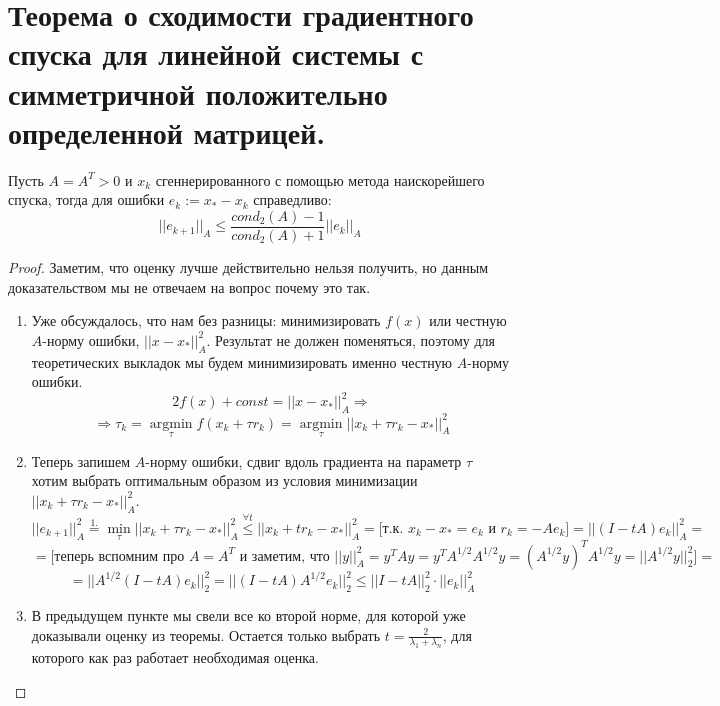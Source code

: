 \section{Теорема о сходимости градиентного спуска для линейной системы с симметричной положительно определенной матрицей.}

\begin{theorem*}
    Пусть $A = A^T > 0$ и $x_k$ сгеннерированного с помощью метода наискорейшего спуска, тогда для ошибки $e_k := x_* - x_k$ справедливо:
    $$||e_{k + 1}||_A \leq \frac{cond_2(A) - 1}{cond_2(A) + 1} ||e_k||_A$$
\end{theorem*}

\begin{proof}
    Заметим, что оценку лучше действительно нельзя получить, но данным доказательством мы не отвечаем на вопрос почему это так.
    
    \begin{enumerate}
        \item Уже обсуждалось, что нам без разницы: минимизировать $f(x)$ или честную $A$-норму ошибки, $||x - x_*||^2_A$. Результат не должен поменяться, поэтому для теоретических выкладок мы будем минимизировать именно честную $A$-норму ошибки.
        $$2f(x) + const = ||x - x_*||^2_A \Rightarrow$$
        $$\Rightarrow \tau_k = \underset{\tau}{\operatorname{argmin}} f(x_k + \tau r_k) = \underset{\tau}{\operatorname{argmin}} ||x_k + \tau r_k - x_*||^2_A$$
        
        \item Теперь запишем $A$-норму ошибки, сдвиг вдоль градиента на параметр $\tau$ хотим выбрать оптимальным образом из условия минимизации $||x_k + \tau r_k - x_*||^2_A$.
        $$||e_{k + 1}||^2_A \overset{1.}{\operatorname{\textrm{ } = \textrm{ }}} \underset{\tau}{\operatorname{min}} ||x_k + \tau r_k - x_*||^2_A \overset{\forall t}{\operatorname{\textrm{ } \leq \textrm{ }}} ||x_k + tr_k - x_*||^2_A = \Big[ \textrm{т.к. } x_k - x_* = e_k \textrm{ и } r_k = -Ae_k \Big] = ||(I - tA)e_k||^2_A =$$
        $$= \Big[ \textrm{теперь вспомним про $A = A^T$ и заметим, что } ||y||^2_A = y^TAy = y^TA^{1/2}A^{1/2}y = (A^{1/2}y)^TA^{1/2}y = ||A^{1/2}y||^2_2 \Big] =$$
        $$= ||A^{1/2}(I - tA)e_k||^2_2 = ||(I - tA)A^{1/2}e_k||^2_2 \leq ||I - tA||^2_2  \cdot ||e_k||^2_A$$
        
        \item В предыдущем пункте мы свели все ко второй норме, для которой уже доказывали оценку из теоремы. Остается только выбрать $t = \frac{2}{\lambda_1 + \lambda_n}$, для которого как раз работает необходимая оценка.
    \end{enumerate}
\end{proof}
